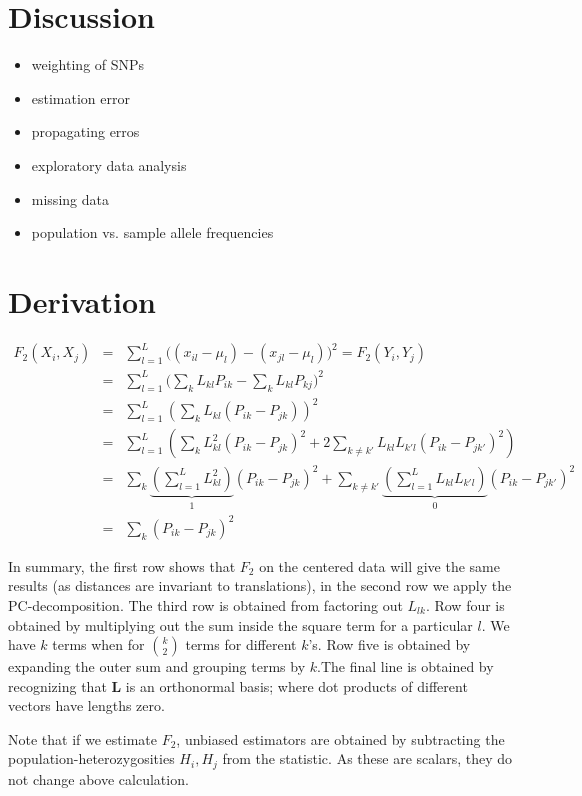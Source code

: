 \documentclass[12pt,a4pape, fullpage]{article}
\newcommand{\ML}{\mathbf{L}} %
\begin{document}
\section{Discussion}
\begin{itemize}
    \item weighting of SNPs
    \item estimation error
    \item propagating erros
    \item exploratory data analysis
    \item missing data
    \item population vs. sample allele frequencies
\end{itemize}

\appendix
\section{Derivation}\label{appendix:fonpc}
\begin{eqnarray}
F_2(X_i, X_j) &=& \sum_{l=1}^L \big( (x_{il} - \mu_l) -(x_{jl} -\mu_l)\big)^2 = F_2(Y_i, Y_j)\nonumber\\
&=& \sum_{l=1}^L \big( \sum_k L_{kl}P_{ik} - \sum_kL_{kl}P_{kj}\big)^2\nonumber\\
&=& \sum_{l=1}^L \left( \sum_k L_{kl} (P_{ik} -P_{jk}) \right)^2\nonumber\\
&=& \sum_{l=1}^L \left( \sum_k L_{kl}^2 (P_{ik} -P_{jk})^2 + 2\sum_{k\neq k'} L_{kl}L_{k'l}(P_{ik} - P_{jk'})^2 \right)\nonumber\\
&=& \sum_k \underbrace{\left(\sum_{l=1}^L L_{kl}^2\right)}_1 (P_{ik} -P_{jk})^2 + \sum_{k\neq k'}\underbrace{\left(\sum_{l=1}^L L_{kl}L_{k'l}\right)}_{0} (P_{ik} - P_{jk'})^2\nonumber\\
&=& \sum_k (P_{ik} - P_{jk})^2
\end{eqnarray}

In summary, the first row shows that $F_2$ on the centered data will give the same results (as distances are invariant to translations), in the second row we apply the PC-decomposition. The third row is obtained from factoring out $L_{lk}$. Row four is obtained by multiplying out the sum inside the square term for a particular $l$. We have $k$ terms when for $\binom{k}{2}$ terms for different $k$'s.  Row five is obtained by expanding the outer sum and grouping terms by $k$.The final line is obtained by recognizing that $\ML$ is an orthonormal basis; where dot products of different vectors have lengths zero.

Note that if we estimate $F_2$, unbiased estimators are obtained by subtracting the population-heterozygosities $H_i, H_j$ from the statistic. As these are scalars, they do not change above calculation.

\end{document}
